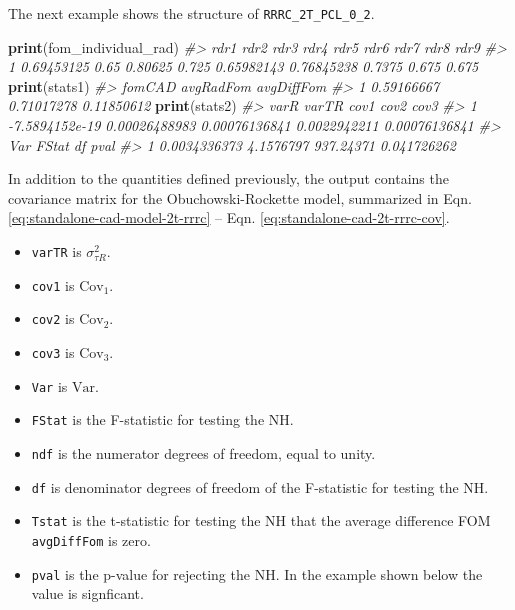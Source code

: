 \documentclass[
]{book}
\newenvironment{Shaded}{\begin{snugshade}}{\end{snugshade}}
\newcommand{\CommentTok}[1]{\textcolor[rgb]{0.56,0.35,0.01}{\textit{#1}}}
\newcommand{\KeywordTok}[1]{\textcolor[rgb]{0.13,0.29,0.53}{\textbf{#1}}}
\newcommand{\NormalTok}[1]{#1}
\providecommand{\tightlist}{%
  \setlength{\itemsep}{0pt}\setlength{\parskip}{0pt}}
\begin{document}
The next example shows the structure of \texttt{RRRC\_2T\_PCL\_0\_2}.

\begin{Shaded}
\begin{Highlighting}[]

\KeywordTok{print}\NormalTok{(fom_individual_rad)}
\CommentTok{#>         rdr1 rdr2    rdr3  rdr4       rdr5       rdr6   rdr7  rdr8  rdr9}
\CommentTok{#> 1 0.69453125 0.65 0.80625 0.725 0.65982143 0.76845238 0.7375 0.675 0.675}
\KeywordTok{print}\NormalTok{(stats1)}
\CommentTok{#>       fomCAD  avgRadFom avgDiffFom}
\CommentTok{#> 1 0.59166667 0.71017278 0.11850612}
\KeywordTok{print}\NormalTok{(stats2)}
\CommentTok{#>             varR         varTR          cov1         cov2          cov3}
\CommentTok{#> 1 -7.5894152e-19 0.00026488983 0.00076136841 0.0022942211 0.00076136841}
\CommentTok{#>            Var     FStat        df        pval}
\CommentTok{#> 1 0.0034336373 4.1576797 937.24371 0.041726262}
\end{Highlighting}
\end{Shaded}

In addition to the quantities defined previously, the output contains the covariance matrix for the Obuchowski-Rockette model, summarized in Eqn. \eqref{eq:standalone-cad-model-2t-rrrc} -- Eqn. \eqref{eq:standalone-cad-2t-rrrc-cov}.

\begin{itemize}
\tightlist
\item
  \texttt{varTR} is \(\sigma_{\tau R}^2\).
\item
  \texttt{cov1} is \(\text{Cov}_1\).
\item
  \texttt{cov2} is \(\text{Cov}_2\).
\item
  \texttt{cov3} is \(\text{Cov}_3\).
\item
  \texttt{Var} is \(\text{Var}\).
\item
  \texttt{FStat} is the F-statistic for testing the NH.
\item
  \texttt{ndf} is the numerator degrees of freedom, equal to unity.
\item
  \texttt{df} is denominator degrees of freedom of the F-statistic for testing the NH.
\item
  \texttt{Tstat} is the t-statistic for testing the NH that the average difference FOM \texttt{avgDiffFom} is zero.
\item
  \texttt{pval} is the p-value for rejecting the NH. In the example shown below the value is signficant.
\end{itemize}
\end{document}
